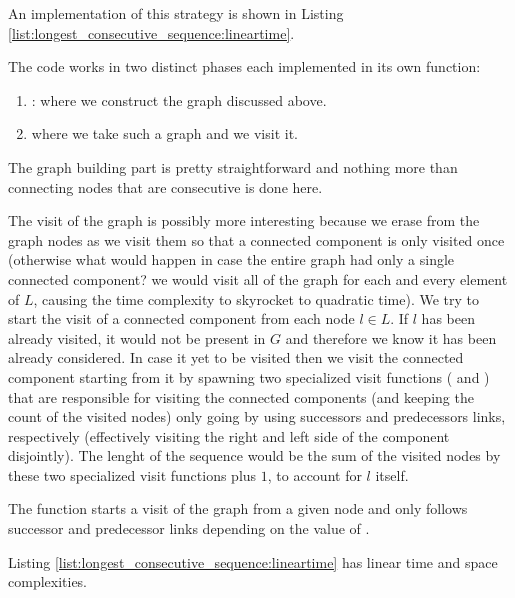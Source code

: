 An implementation of this strategy is shown in  Listing \ref{list:longest_consecutive_sequence:lineartime}.



The code works in two distinct phases each implemented in its own function:
\begin{enumerate}
	\item {}: where we construct the graph discussed above.
	\item {} where we take such a graph and we visit it.
\end{enumerate}

The graph building part is pretty straightforward and nothing more than connecting nodes that are consecutive is done here. 

The visit of the graph is possibly more interesting because we erase from the graph nodes  as we visit them so that a connected component is only visited once (otherwise what would happen in case the entire graph had only a single connected component? we would visit all of the graph for each and every element of $L$, causing the time complexity to skyrocket to quadratic time).
We try to start the visit of a connected component from each node $l \in L$.
If $l$ has been already visited, it would not be present in $G$ and therefore we know it has been already considered.
In case it yet to be visited then we visit the connected component starting from it by spawning two specialized visit functions ( and ) that are responsible for visiting the connected components (and keeping the count of the visited nodes) only going by using successors and predecessors links, respectively (effectively visiting the right and left side of the component disjointly).
The lenght of the sequence would be the sum of the visited nodes by these two specialized visit functions  plus $1$, to account for $l$ itself.

The function  starts a visit of the graph from a given node and only follows successor and predecessor links depending on the  value of .

Listing \ref{list:longest_consecutive_sequence:lineartime} has linear time and space complexities.
